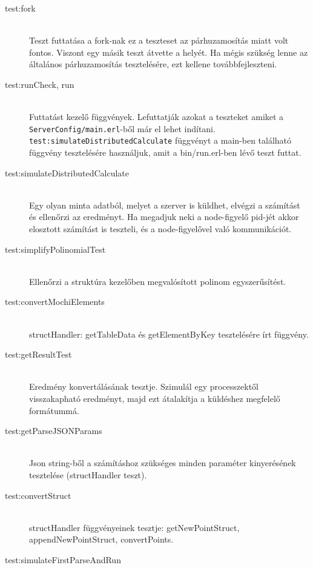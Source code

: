 		\begin{description}
		\item[test:fork] \hfill \\
			Teszt futtatása a fork-nak ez a teszteset az párhuzamosítás miatt volt fontos. Viszont egy másik teszt átvette a helyét.
			\newline
			Ha mégis szükség lenne az általános párhuzamosítás tesztelésére, ezt kellene továbbfejleszteni.

		\item[test:runCheck, run] \hfill \\
			Futtatást kezelő függvények.
			Lefuttatják azokat a teszteket amiket a \\ 
			\texttt{ServerConfig/main.erl}-ből már el lehet indítani. 
			\newline \texttt{test:simulateDistributedCalculate} függvényt a main-ben található függvény tesztelésére használjuk, amit a bin/run.erl-ben lévő teszt futtat.
		\item[test:simulateDistributedCalculate] \hfill \\
			Egy olyan minta adatból, melyet a szerver is küldhet, elvégzi a számítást és ellenőrzi az eredményt. \newline
			Ha megadjuk neki a node-figyelő pid-jét akkor elosztott számítást is teszteli, és a node-figyelővel való kommunikációt. 
		\item[test:simplifyPolinomialTest] \hfill \\
			Ellenőrzi a struktúra kezelőben megvalósított polinom egyszerűsítést.  
		\item[test:convertMochiElements] \hfill \\
			structHandler: getTableData és getElementByKey tesztelésére írt függvény.
		\item[test:getResultTest] \hfill \\
			Eredmény konvertálásának tesztje. Szimulál egy processzektől visszakapható eredményt, majd ezt átalakítja a küldéshez megfelelő formátummá.
		\item[test:getParseJSONParams] \hfill \\
			Json string-ből a számításhoz szükséges minden paraméter kinyerésének tesztelése (structHandler teszt).
		\item[test:convertStruct] \hfill \\
			structHandler függvényeinek tesztje: \newline
			getNewPointStruct, appendNewPointStruct, convertPoints.
		\item[test:simulateFirstParseAndRun] \hfill \\

\end{description}
